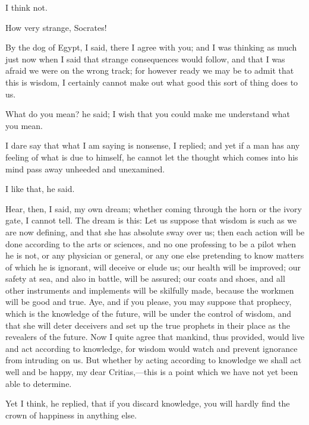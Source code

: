 \documentclass[11pt,letter]{article}
\begin{document}
\par  I think not.

\par  How very strange, Socrates!

\par  By the dog of Egypt, I said, there I agree with you; and I was thinking as much just now when I said that strange consequences would follow, and that I was afraid we were on the wrong track; for however ready we may be to admit that this is wisdom, I certainly cannot make out what good this sort of thing does to us.

\par  What do you mean? he said; I wish that you could make me understand what you mean.

\par  I dare say that what I am saying is nonsense, I replied; and yet if a man has any feeling of what is due to himself, he cannot let the thought which comes into his mind pass away unheeded and unexamined.

\par  I like that, he said.

\par  Hear, then, I said, my own dream; whether coming through the horn or the ivory gate, I cannot tell. The dream is this: Let us suppose that wisdom is such as we are now defining, and that she has absolute sway over us; then each action will be done according to the arts or sciences, and no one professing to be a pilot when he is not, or any physician or general, or any one else pretending to know matters of which he is ignorant, will deceive or elude us; our health will be improved; our safety at sea, and also in battle, will be assured; our coats and shoes, and all other instruments and implements will be skilfully made, because the workmen will be good and true. Aye, and if you please, you may suppose that prophecy, which is the knowledge of the future, will be under the control of wisdom, and that she will deter deceivers and set up the true prophets in their place as the revealers of the future. Now I quite agree that mankind, thus provided, would live and act according to knowledge, for wisdom would watch and prevent ignorance from intruding on us. But whether by acting according to knowledge we shall act well and be happy, my dear Critias,—this is a point which we have not yet been able to determine.

\par  Yet I think, he replied, that if you discard knowledge, you will hardly find the crown of happiness in anything else.
\end{document}
